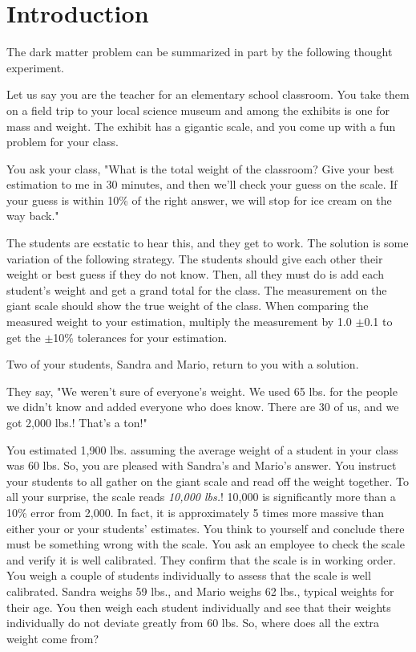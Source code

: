 \section{Introduction\label{sec:intro2dm}}

The dark matter problem can be summarized in part by the following thought experiment.

Let us say you are the teacher for an elementary school classroom.
You take them on a field trip to your local science museum and among the exhibits is one for mass and weight.
The exhibit has a gigantic scale, and you come up with a fun problem for your class.

You ask your class, "What is the total weight of the classroom?
Give your best estimation to me in 30 minutes, and then we'll check your guess on the scale.
If your guess is within 10\% of the right answer, we will stop for ice cream on the way back."

The students are ecstatic to hear this, and they get to work.
The solution is some variation of the following strategy.
The students should give each other their weight or best guess if they do not know.
Then, all they must do is add each student's weight and get a grand total for the class.
The measurement on the giant scale should show the true weight of the class.
When comparing the measured weight to your estimation, multiply the measurement by 1.0 $\pm$0.1 to get the $\pm$10\% tolerances for your estimation.

Two of your students, Sandra and Mario, return to you with a solution.

They say, "We weren't sure of everyone's weight.
We used 65 lbs. for the people we didn't know and added everyone who does know.
There are 30 of us, and we got 2,000 lbs.!
That's a ton!"

You estimated 1,900 lbs. assuming the average weight of a student in your class was 60 lbs.
So, you are pleased with Sandra's and Mario's answer.
You instruct your students to all gather on the giant scale and read off the weight together.
To all your surprise, the scale reads \textit{10,000 lbs.}!
10,000 is significantly more than a 10\% error from 2,000.
In fact, it is approximately 5 times more massive than either your or your students' estimates.
You think to yourself and conclude there must be something wrong with the scale.
You ask an employee to check the scale and verify it is well calibrated.
They confirm that the scale is in working order.
You weigh a couple of students individually to assess that the scale is well calibrated.
Sandra weighs 59 lbs., and Mario weighs 62 lbs., typical weights for their age.
You then weigh each student individually and see that their weights individually do not deviate greatly from 60 lbs.
So, where does all the extra weight come from?

